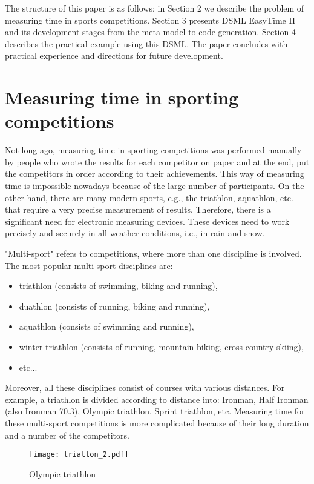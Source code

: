 \documentclass[preprint, prX]{revtex4}
\begin{document}
The structure of this paper is as follows: in Section 2 we describe the problem of measuring time in sports competitions. Section 3 presents DSML EasyTime II and its development stages from the meta-model to code generation. Section 4 describes the practical example using this DSML. The paper concludes with practical experience and directions for future development.

\section{Measuring time in sporting competitions}

Not long ago, measuring time in sporting competitions was performed manually by people who wrote the results for each competitor on paper and at the end, put the competitors in order according to their achievements. This way of measuring time is impossible nowadays because of the large number of participants. On the other hand, there are many modern sports, e.g., the triathlon, aquathlon, etc. that require a very precise measurement of results. Therefore, there is a significant need for electronic measuring devices. These devices need to work precisely and securely in all weather conditions, i.e., in rain and snow. 

"Multi-sport" refers to competitions, where more than one discipline is involved. The most popular multi-sport disciplines are:
\begin{itemize}
\item triathlon (consists of swimming, biking and running),
\item duathlon (consists of running, biking and running),
\item aquathlon (consists of swimming and running),
\item winter triathlon (consists of running, mountain biking, cross-country skiing),
\item etc...
\end{itemize}
Moreover, all these disciplines consist of courses with various distances. For example, a triathlon is divided according to distance into: Ironman, Half Ironman (also Ironman 70.3), Olympic triathlon, Sprint triathlon, etc. Measuring time for these multi-sport competitions is more complicated because of their long duration and a number of the competitors. 

\begin{figure}[htb]
\begin{center}
\texttt{[image: triatlon\_2.pdf]} \caption{Olympic triathlon}
\label{pic:Olympic}
\end{center}
\vspace{-5mm}
\end{figure}
\end{document}
